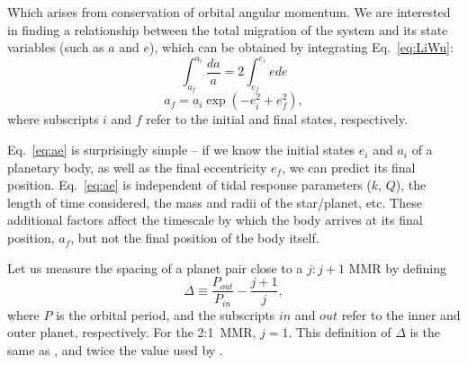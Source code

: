 Which arises from conservation of orbital angular momentum.
We are interested in finding a relationship between the total migration of the system and its state variables (such as $a$ and $e$), which can be obtained by integrating Eq.~\ref{eq:LiWu}: 
\begin{equation*}
\int_{a_f}^{a_i} \frac{da}{a} = 2\int_{e_f}^{e_i} ede
\end{equation*}
\begin{equation}
a_f  = a_i \exp(- e_i^2 + e_f^2),
\label{eq:ae}
\end{equation}
where subscripts $i$ and $f$ refer to the initial and final states, respectively. 

Eq.~\ref{eq:ae} is surprisingly simple -- if we know the initial states $e_i$ and $a_i$ of a planetary body, as well as the final eccentricity $e_f$, we can predict its final position. 
Eq.~\ref{eq:ae} is independent of tidal response parameters ($k$, $Q$), the length of time considered, the mass and radii of the star/planet, etc. 
These additional factors affect the timescale by which the body arrives at its final position, $a_f$, but not the final position of the body itself. 

Let us measure the spacing of a planet pair close to a $j:j+1$ MMR by defining 
\begin{equation}
\Delta \equiv \frac{P_{out}}{P_{in}} - \frac{j+1}{j},
\label{eq:Delta}
\end{equation}
where $P$ is the orbital period, and the subscripts $in$ and $out$ refer to the inner and outer planet, respectively. 
For the 2:1~MMR, $j= 1$. 
This definition of $\Delta$ is the same as \citet{Lee2013}, and twice the value used by \citet{LithwickWu2012}. 

